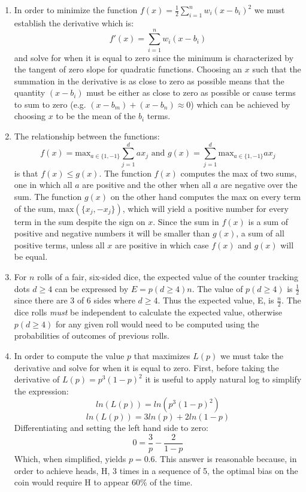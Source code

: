 \documentclass[12pt]{article}
\begin{document}
\begin{enumerate}[label=(\alph*)]
  \item In order to minimize the function
  \(f(x) = \frac{1}{2}\sum_{i=1}^{n}w_i(x-b_i)^2\)
	we must establish the derivative which is:
  \[f'(x) = \sum_{i=1}^{n}w_i(x-b_i)\]
  and solve for when it is equal to zero since the minimum is characterized
  by the tangent of zero slope for quadratic functions. Choosing
  an \(x\) such that the summation in the derivative is as close to zero as
  possible means that the quantity \((x-b_i)\) must be either as close to
  zero as possible or cause terms to sum to zero
  (e.g. \((x-b_m) + (x-b_n) \approx 0\))
  which can be achieved by choosing
  \(x\) to be the mean of the \(b_i\) terms.

  \item The relationship between the functions:
  \[
		f(x)=\text{max}_{a\in\{1,-1\}}\sum_{j=1}^dax_j
		\text{ and }
		g(x)=\sum_{j=1}^d\text{max}_{a\in\{1,-1\}}ax_j
	\]
  is that \(f(x) \leq g(x)\). The function \(f(x)\) computes the max
  of two sums, one in which all \(a\) are positive and the other when
  all \(a\) are negative over the sum.
  The function \(g(x)\) on the other hand
  computes the max on every term of the sum,
	\(\text{max}(\{x_j, -x_j\})\),
  which will yield a positive number for every term in the sum
  despite the sign on \(x\). Since the
  sum in \(f(x)\) is a sum of positive and negative numbers it will be
  smaller than \(g(x)\), a sum of all positive terms, unless all \(x\)
  are positive in which case \(f(x)\) and \(g(x)\) will be equal.

  \item For \(n\) rolls of a fair, six-sided dice, the expected value of the
  counter tracking dots \(d\geq4\) can be expressed by \(E = p(d\geq4)n\).
  The value of \(p(d\geq4)\) is \(\frac{1}{2}\) since there are 3 of 6 sides where
  \(d\geq4\). Thus the expected value, E, is \(\frac{n}{2}\). The dice
  rolls \textit{must} be independent to calculate the expected
  value, otherwise \(p(d\geq4)\) for any given roll would need to be computed
  using the probabilities of outcomes of previous rolls.

  \item In order to compute the value \(p\) that maximizes \(L(p)\) we must
  take the derivative and solve for when it is equal to zero. First, before
  taking the derivative of \(L(p)=p^3(1-p)^2\) it is useful to apply
  natural log to simplify the expression:
  \[ln(L(p))=ln(p^3(1-p)^2)\]
  \[ln(L(p))=3ln(p) + 2ln(1-p)\]
  Differentiating and setting the left hand side to zero:
  \[0 = \frac{3}{p} - \frac{2}{1-p}\]
  Which, when simplified, yields \(p=0.6\). This answer is reasonable because,
  in order to achieve heads, H, 3 times in a sequence of 5, the
  optimal bias on the coin would require H to appear 60\% of the time.


\end{enumerate}
\end{document}
